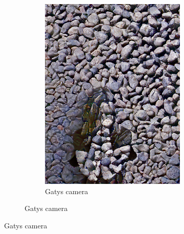 \begin{figure}[]
\begin{subfigure}{\textwidth}
\begin{subfigure}{0.24\textwidth}
            \includegraphics[width=\textwidth]{images/04-experiment02/human/pebbles/gatys_proj.jpg}
            \caption*{Gatys camera}
        \end{subfigure}
        

\end{subfigure}
\end{figure}
